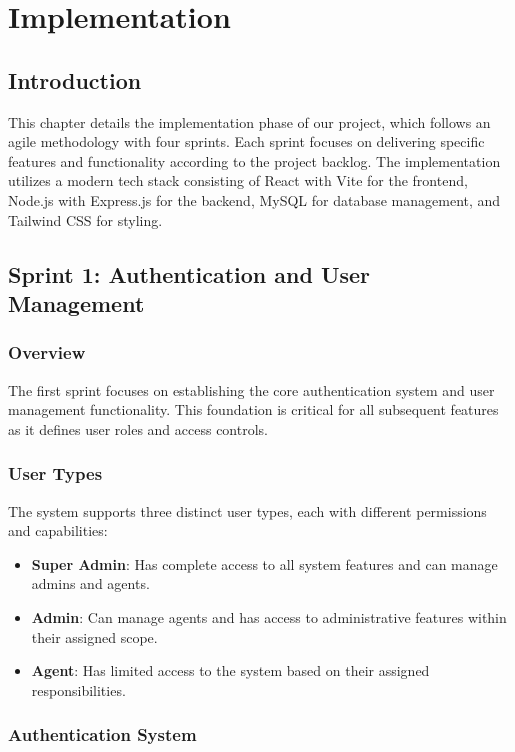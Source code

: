 \chapter{Implementation}

\section{Introduction}
This chapter details the implementation phase of our project, which follows an agile methodology with four sprints. Each sprint focuses on delivering specific features and functionality according to the project backlog. The implementation utilizes a modern tech stack consisting of React \cite{ReactWebsite} with Vite \cite{ViteJSWebsite} for the frontend, Node.js \cite{NodeJSWebsite} with Express.js \cite{ExpressJSWebsite} for the backend, MySQL \cite{MySQLWebsite} for database management, and Tailwind CSS \cite{TailwindWebsite} for styling.

\section{Sprint 1: Authentication and User Management}
\subsection{Overview}
The first sprint focuses on establishing the core authentication system and user management functionality. This foundation is critical for all subsequent features as it defines user roles and access controls.

\subsection{User Types}
The system supports three distinct user types, each with different permissions and capabilities:
\begin{itemize}
    \item \textbf{Super Admin}: Has complete access to all system features and can manage admins and agents.
    \item \textbf{Admin}: Can manage agents and has access to administrative features within their assigned scope.
    \item \textbf{Agent}: Has limited access to the system based on their assigned responsibilities.
\end{itemize}

\newpage

\subsection{Authentication System}
